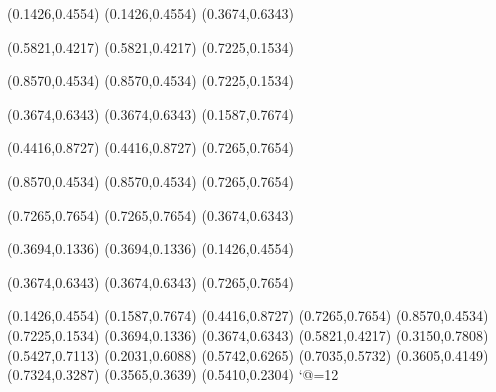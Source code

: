 \PST@Dashed(0.1426,0.4554)
(0.1426,0.4554)
(0.3674,0.6343)

\PST@Dashed(0.5821,0.4217)
(0.5821,0.4217)
(0.7225,0.1534)

\PST@Dashed(0.8570,0.4534)
(0.8570,0.4534)
(0.7225,0.1534)

\PST@Dashed(0.3674,0.6343)
(0.3674,0.6343)
(0.1587,0.7674)

\PST@Dashed(0.4416,0.8727)
(0.4416,0.8727)
(0.7265,0.7654)

\PST@Dashed(0.8570,0.4534)
(0.8570,0.4534)
(0.7265,0.7654)

\PST@Dashed(0.7265,0.7654)
(0.7265,0.7654)
(0.3674,0.6343)

\PST@Dashed(0.3694,0.1336)
(0.3694,0.1336)
(0.1426,0.4554)

\PST@Dashed(0.3674,0.6343)
(0.3674,0.6343)
(0.7265,0.7654)

\PST@Fillcircle(0.1426,0.4554)
\PST@Fillcircle(0.1587,0.7674)
\PST@Fillcircle(0.4416,0.8727)
\PST@Fillcircle(0.7265,0.7654)
\PST@Fillcircle(0.8570,0.4534)
\PST@Fillcircle(0.7225,0.1534)
\PST@Fillcircle(0.3694,0.1336)
\PST@Fillcircle(0.3674,0.6343)
\PST@Fillcircle(0.5821,0.4217)
\PST@Circle(0.3150,0.7808)
\PST@Circle(0.5427,0.7113)
\PST@Circle(0.2031,0.6088)
\PST@Circle(0.5742,0.6265)
\PST@Circle(0.7035,0.5732)
\PST@Circle(0.3605,0.4149)
\PST@Circle(0.7324,0.3287)
\PST@Circle(0.3565,0.3639)
\PST@Circle(0.5410,0.2304)
\catcode`@=12
\fi
\endpspicture
